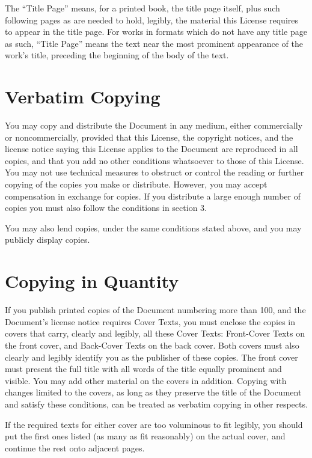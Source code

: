 \documentclass[a4paper]{report}
\begin{document}
The ``Title Page'' means, for a printed book, the title page itself,
plus such following pages as are needed to hold, legibly, the material
this License requires to appear in the title page.  For works in
formats which do not have any title page as such, ``Title Page'' means
the text near the most prominent appearance of the work's title,
preceding the beginning of the body of the text.


\section*{Verbatim Copying}

You may copy and distribute the Document in any medium, either
commercially or noncommercially, provided that this License, the
copyright notices, and the license notice saying this License applies
to the Document are reproduced in all copies, and that you add no other
conditions whatsoever to those of this License.  You may not use
technical measures to obstruct or control the reading or further
copying of the copies you make or distribute.  However, you may accept
compensation in exchange for copies.  If you distribute a large enough
number of copies you must also follow the conditions in section 3.

You may also lend copies, under the same conditions stated above, and
you may publicly display copies.


\section*{Copying in Quantity}

If you publish printed copies of the Document numbering more than 100,
and the Document's license notice requires Cover Texts, you must enclose
the copies in covers that carry, clearly and legibly, all these Cover
Texts: Front-Cover Texts on the front cover, and Back-Cover Texts on
the back cover.  Both covers must also clearly and legibly identify
you as the publisher of these copies.  The front cover must present
the full title with all words of the title equally prominent and
visible.  You may add other material on the covers in addition.
Copying with changes limited to the covers, as long as they preserve
the title of the Document and satisfy these conditions, can be treated
as verbatim copying in other respects.

If the required texts for either cover are too voluminous to fit
legibly, you should put the first ones listed (as many as fit
reasonably) on the actual cover, and continue the rest onto adjacent
pages.
\end{document}
